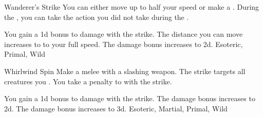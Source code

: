 \lowercase{\hypertarget{maneuver:Wanderer's Strike}{}}\label{maneuver:Wanderer's Strike}
\begin{freeability}{\hypertarget{maneuver:Wanderer's Strike}{Wanderer's Strike}}
You can either move up to half your speed or make a .
During the , you can take the action you did not take during the .

\rankline
{} You gain a \plus1d bonus to damage with the strike.
 The distance you can move increases to to your full speed.
 The damage bonus increases to \plus2d.
 Esoteric, Primal, Wild
\end{freeability}
\vspace{0.25em}



\lowercase{\hypertarget{maneuver:Whirlwind Spin}{}}\label{maneuver:Whirlwind Spin}
\begin{apability}{\hypertarget{maneuver:Whirlwind Spin}{Whirlwind Spin}}
Make a melee  with a slashing weapon.
The strike targets all creatures you .
You take a  penalty to  with the strike.

\rankline
{} You gain a \plus1d bonus to damage with the strike.
 The damage bonus increases to \plus2d.
 The damage bonus increases to \plus3d.
 Esoteric, Martial, Primal, Wild
\end{apability}
\vspace{0.25em}


